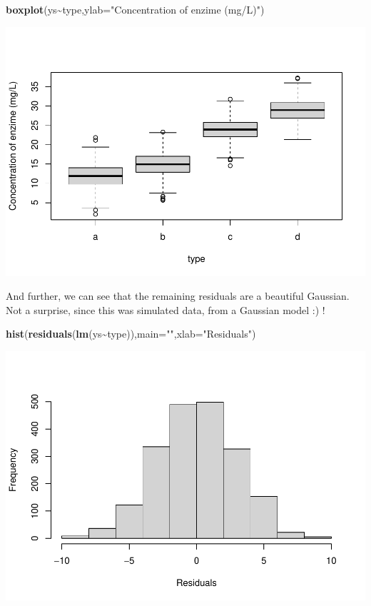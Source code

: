 \documentclass[
]{book}
\newenvironment{Shaded}{\begin{snugshade}}{\end{snugshade}}
\newcommand{\AttributeTok}[1]{\textcolor[rgb]{0.13,0.29,0.53}{#1}}
\newcommand{\FunctionTok}[1]{\textcolor[rgb]{0.13,0.29,0.53}{\textbf{#1}}}
\newcommand{\NormalTok}[1]{#1}
\newcommand{\SpecialCharTok}[1]{\textcolor[rgb]{0.81,0.36,0.00}{\textbf{#1}}}
\newcommand{\StringTok}[1]{\textcolor[rgb]{0.31,0.60,0.02}{#1}}
\begin{document}
\begin{Shaded}
\begin{Highlighting}[]
\FunctionTok{boxplot}\NormalTok{(ys}\SpecialCharTok{\textasciitilde{}}\NormalTok{type,}\AttributeTok{ylab=}\StringTok{"Concentration of enzime (mg/L)"}\NormalTok{)}
\end{Highlighting}
\end{Shaded}

\includegraphics{ECOMODbook_files/figure-latex/reg11-1.pdf}

And further, we can see that the remaining residuals are a beautiful Gaussian. Not a surprise, since this was simulated data, from a Gaussian model :) !

\begin{Shaded}
\begin{Highlighting}[]
\FunctionTok{hist}\NormalTok{(}\FunctionTok{residuals}\NormalTok{(}\FunctionTok{lm}\NormalTok{(ys}\SpecialCharTok{\textasciitilde{}}\NormalTok{type)),}\AttributeTok{main=}\StringTok{""}\NormalTok{,}\AttributeTok{xlab=}\StringTok{"Residuals"}\NormalTok{)}
\end{Highlighting}
\end{Shaded}

\includegraphics{ECOMODbook_files/figure-latex/reg12-1.pdf}
\end{document}
